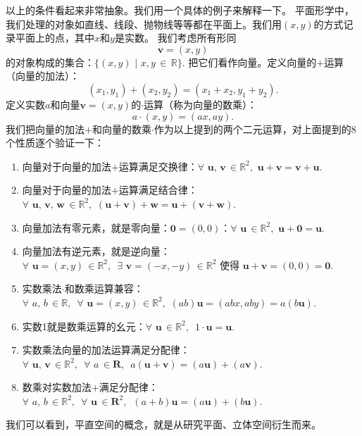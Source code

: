 \documentclass[12pt,UTF8,fontset=none]{ctexbook}
\begin{document}
以上的条件看起来非常抽象。我们用一个具体的例子来解释一下。
平面形学中，我们处理的对象如直线、线段、抛物线等等都在平面上。我们用$(x,y)$的方式记录平面上的点，其中$x$和$y$是实数。
我们考虑所有形同
$$ \mathbf{v} = (x, y)$$
的对象构成的集合：$\{(x, y) \,\,|\,\, x,y\,\in\,\mathbb{R}\}.$ 把它们看作向量。定义向量的$+$运算（向量的加法）：
$$ (x_1, y_1) + (x_2, y_2) = (x_1+x_2, y_1+y_2).$$
定义实数$a$和向量$ \mathbf{v} = (x, y)$的$\cdot$运算（称为向量的数乘）：
$$ a \cdot (x, y) = (ax, ay).$$
我们把向量的加法$+$和向量的数乘$\cdot$作为以上提到的两个二元运算，对上面提到的8个性质逐个验证一下：
\begin{enumerate}
    \item 向量对于向量的加法$+$运算满足交换律：$\forall \,\, \mathbf{u}, \, \mathbf{v} \, \in \mathbb{R}^2, \,\, \mathbf{u} + \mathbf{v} = \mathbf{v} + \mathbf{u}.$
    \item 向量对于向量的加法$+$运算满足结合律：$\forall \,\, \mathbf{u}, \, \mathbf{v}, \, \mathbf{w} \, \in \mathbb{R}^2, \,\, (\mathbf{u} + \mathbf{v}) + \mathbf{w} = \mathbf{u} + (\mathbf{v} + \mathbf{w}).$
    \item 向量加法有零元素，就是零向量：$\mathbf{0} = (0, 0)$：$\forall \,\, \mathbf{u} \, \in \mathbb{R}^2, \,\, \mathbf{u} + \mathbf{0} = \mathbf{u}.$
    \item 向量加法有逆元素，就是逆向量：$\forall \,\, \mathbf{u} = (x, y) \, \in \mathbb{R}^2, \,\,\, \exists \,\, \mathbf{v} = (-x, -y)\, \in \mathbb{R}^2$ 使得 $\mathbf{u} + \mathbf{v} = (0, 0) = \mathbf{0}.$
    \item 实数乘法$\cdot$和数乘运算兼容：$\forall \,\, a, \, b \, \in \mathbb{R}, \,\,\, \forall \,\, \mathbf{u} = (x, y) \, \in \mathbb{R}^2, \,\, (ab)\mathbf{u} = (abx, aby)= a(b\mathbf{u}).$
    \item 实数1就是数乘运算的幺元：$\forall \,\, \mathbf{u} \, \in \mathbb{R}^2, \,\,\, 1\cdot \mathbf{u} = \mathbf{u}. $
    \item 实数乘法向量的加法运算满足分配律：$\forall \,\, \mathbf{u}, \, \mathbf{v} \, \in \mathbb{R}^2, \,\,\, \forall \,\, a \, \in \mathbf{R}, \,\,\, a(\mathbf{u} + \mathbf{v}) = (a \mathbf{u}) + (a \mathbf{v}). $
    \item 数乘对实数加法$+$满足分配律：$\forall \,\, a, \, b \, \in \mathbb{R}^2, \,\,\, \forall \,\, \mathbf{u} \, \in \mathbf{R}^2, \,\,\, (a + b)\mathbf{u} = (a \mathbf{u}) + (b \mathbf{u}). $
\end{enumerate}

我们可以看到，平直空间的概念，就是从研究平面、立体空间衍生而来。
\end{document}
